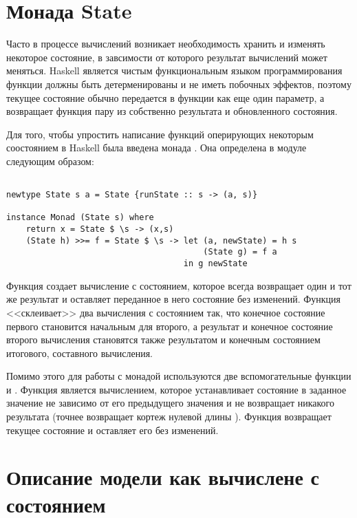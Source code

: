 \section{Монада State}

Часто в процессе вычислений возникает необходимость хранить и изменять некоторое состояние, в завсимости от которого результат вычислений может меняться. Haskell является чистым функциональным языком программирования функции должны быть детерменированы и не иметь побочных эффектов, поэтому текущее состояние обычно передается в функции как еще один параметр, а возвращает функция пару из собственно результата и обновленного состояния.

Для того, чтобы упростить написание функций оперирующих некоторым соостоянием в Haskell была введена монада . Она определена в модуле  следующим образом:

\begin{verbatim}

newtype State s a = State {runState :: s -> (a, s)}

instance Monad (State s) where
    return x = State $ \s -> (x,s)
    (State h) >>= f = State $ \s -> let (a, newState) = h s
                                        (State g) = f a
                                    in g newState

\end{verbatim}

Функция  создает вычисление с состоянием, которое всегда возвращает один и тот же результат и оставляет переданное в него состояние без изменений. Функция \Code{$>>=$} <<склеивает>> два вычисления с состоянием так, что конечное  состояние первого становится начальным для второго, а результат и конечное состояние второго вычисления становятся также результатом и конечным состоянием итогового, составного вычисления.

Помимо этого для работы с монадой  используются две вспомогательные функции  и . Функция  является вычислением, которое устанавливает состояние в заданное значение не зависимо от его предыдущего значения и не возвращает никакого результата (точнее возвращает кортеж нулевой длины \Code{()}). Функция  возвращает текущее состояние и оставляет его без изменений. 

\section{Описание модели как вычислене с состоянием}

